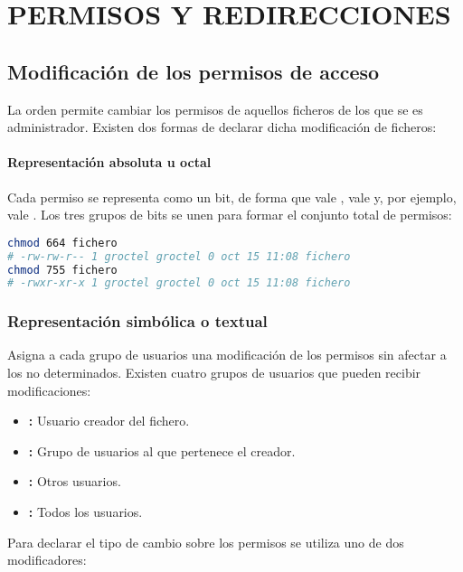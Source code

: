 \chapter{PERMISOS Y REDIRECCIONES}

\section{Modificación de los permisos de acceso}

La orden  permite cambiar los permisos de aquellos ficheros de los que se es administrador.
Existen dos formas de declarar dicha modificación de ficheros:

\subsubsection{Representación absoluta u octal}

Cada permiso  se representa como un bit, de forma que \code{---} vale ,  vale  y, por ejemplo,  vale .
Los tres grupos de bits se unen para formar el conjunto total de permisos:

\begin{lstlisting}[language=sh]
chmod 664 fichero
# -rw-rw-r-- 1 groctel groctel 0 oct 15 11:08 fichero
chmod 755 fichero
# -rwxr-xr-x 1 groctel groctel 0 oct 15 11:08 fichero
\end{lstlisting}

\subsection{Representación simbólica o textual}

Asigna a cada grupo de usuarios una modificación de los permisos sin afectar a los no determinados.
Existen cuatro grupos de usuarios que pueden recibir modificaciones:

\begin{itemize}
	\item{}\textbf{:} Usuario creador del fichero.
	\item{}\textbf{:} Grupo de usuarios al que pertenece el creador.
	\item{}\textbf{:} Otros usuarios.
	\item{}\textbf{:} Todos los usuarios.
\end{itemize}

Para declarar el tipo de cambio sobre los permisos se utiliza uno de dos modificadores:

